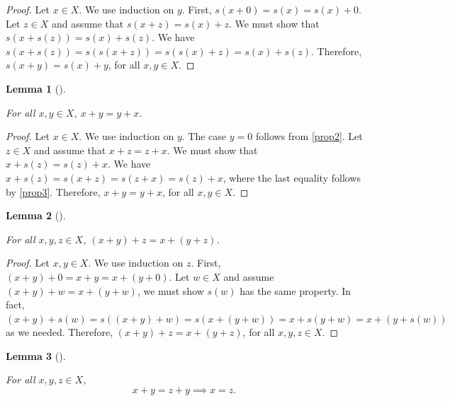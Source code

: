 \documentclass[
  letterpaper,
  10pt,
  reqno,
  twopage,
  openany]{book}
\theoremstyle{plain}
\newtheorem{lemma}{Lemma}[chapter]
\theoremstyle{definition}
\theoremstyle{definition}
\theoremstyle{definition}
\theoremstyle{plain}
\theoremstyle{plain}
\theoremstyle{remark}
\begin{document}
\begin{proof}

Let \(x\in X\). We use induction on \(y\). First,
\(s(x+0)=s(x)=s(x)+0\). Let \(z\in X\) and assume that
\(s(x+z)=s(x)+z\). We must show that \(s(x+s(z))=s(x)+s(z)\). We have
\(s(x+s(z))=s(s(x+z))=s(s(x)+z)=s(x)+s(z)\). Therefore,
\(s(x+y)=s(x)+y\), for all \(x,y\in X\).

\end{proof}

\leavevmode{}%
\begin{lemma}[]\label{lem-}

\label{prop4} For all \(x,y\in X\), \(x+y=y+x\).

\end{lemma}

\begin{proof}

Let \(x\in X\). We use induction on \(y\). The case \(y=0\) follows from
\ref{prop2}. Let \(z\in X\) and assume that \(x+z=z+x\). We must show
that \(x+s(z)=s(z)+x\). We have \(x+s(z)=s(x+z)=s(z+x)=s(z)+x\), where
the last equality follows by \ref{prop3}. Therefore, \(x+y=y+x\), for
all \(x,y\in X\).

\end{proof}

\leavevmode{}%
\begin{lemma}[]\label{lem-}

For all \(x,y,z\in X\), \((x+y)+z=x+(y+z)\).

\end{lemma}

\begin{proof}

Let \(x,y\in X\). We use induction on \(z\). First,
\((x+y)+0=x+y=x+(y+0)\). Let \(w\in X\) and assume \((x+y)+w=x+(y+w)\),
we must show \(s(w)\) has the same property. In fact,
\((x+y)+s(w)=s((x+y)+w)=s(x+(y+w))=x+s(y+w)=x+(y+s(w))\) as we needed.
Therefore, \((x+y)+z=x+(y+z)\), for all \(x,y,z\in X\).

\end{proof}

\leavevmode{}%
\begin{lemma}[]\label{lem-}

\label{addcan} For all \(x,y,z\in X\), \begin{equation}
\label{canadd}
x+y=z+y\implies x=z. 
\end{equation}

\end{lemma}
\end{document}
